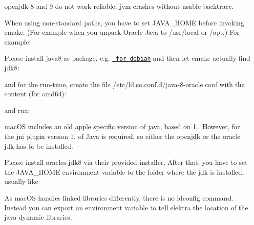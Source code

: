 openjdk-\/8 and 9 do not work reliable\+: jvm crashes without usable backtrace.

When using non-\/standard paths, you have to set J\+A\+V\+A\+\_\+\+H\+O\+ME before invoking cmake. (For example when you unpack Oracle Java to {\ttfamily /usr/local} or {\ttfamily /opt}.) For example\+:


\begin{DoxyCode}{0}
\end{DoxyCode}


Please install java8 as package, e.\+g. \href{http://www.webupd8.org/2014/03/how-to-install-oracle-java-8-in-debian.html}{\texttt{ for debian}} and then let cmake actually find jdk8\+:


\begin{DoxyCode}{0}
\end{DoxyCode}


and for the run-\/time, create the file {\ttfamily /etc/ld.so.\+conf.\+d/java-\/8-\/oracle.conf} with the content (for amd64)\+:


\begin{DoxyCode}{0}
\end{DoxyCode}


and run\+:


\begin{DoxyCode}{0}
\end{DoxyCode}


mac\+OS includes an old apple specific version of java, based on 1.. However, for the jni plugin version 1. of Java is required, so either the openjdk or the oracle jdk has to be installed.

Please install oracle\textquotesingle{}s jdk8 via their provided installer. After that, you have to set the J\+A\+V\+A\+\_\+\+H\+O\+ME environment variable to the folder where the jdk is installed, usually like


\begin{DoxyCode}{0}
\end{DoxyCode}


As mac\+OS handles linked libraries differently, there is no ldconfig command. Instead you can export an environment variable to tell elektra the location of the java dynamic libraries.


